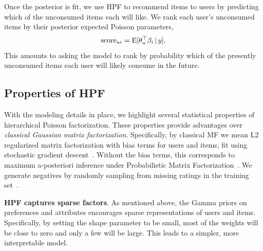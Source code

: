 
Once the posterior is fit, we use HPF to recommend items to users by
predicting which of the unconsumed items each will like.  We rank each
user's unconsumed items by their posterior expected Poisson
parameters,
\begin{equation}
  \label{eq:score}
  \textrm{score}_{ui} = \textrm{E}[\theta_u^\top \beta_i \,\vert\, y].
\end{equation}
This amounts to asking the model to rank by probability which of the
presently unconsumed items each user will likely consume in the
future.

\subsection{Properties of HPF}
\label{sec:properties}
With the modeling details in place, we highlight several statistical
properties of hierarchical Poisson factorization.  These properties
provide advantages over \emph{classical Gaussian matrix
  factorization}. Specifically, by classical MF we mean L2 regularized
matrix factorization with bias terms for users and items, fit using
stochastic gradient descent~\cite{Koren:2009}. Without the bias terms,
this corresponds to maximum a-posteriori inference under Probabilistic
Matrix Factorization~\cite{Salakhutdinov:2008a}. We generate negatives
by randomly sampling from missing ratings in the training
set~\cite{Dror:2012a,Gantner:2012p9364,Paquet:2013p9197}.

{\bf HPF captures sparse factors}.  As mentioned above, the Gamma
priors on preferences and attributes encourages sparse representations
of users and items.  Specifically, by setting the shape parameter to
be small, most of the weights will be close to zero and only a few
will be large. This leads to a simpler, more interpretable model.


